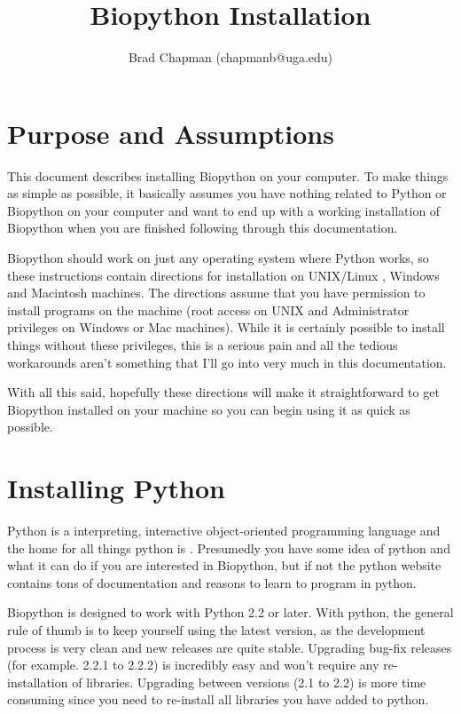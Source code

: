 \documentclass{article}
\begin{document}
\title{Biopython Installation}
\author{Brad Chapman (chapmanb@uga.edu)}

\maketitle
\tableofcontents

\section{Purpose and Assumptions}

This document describes installing Biopython on your computer. To make
things as simple as possible, it basically assumes you have nothing
related to Python or Biopython on your computer and want to end up with
a working installation of Biopython when you are finished following
through this documentation. 


Biopython should work on just any operating system where Python works,
so these instructions contain directions for installation on UNIX/Linux
, Windows and Macintosh machines. The directions assume 
that you have permission to install programs on the machine
(root access on UNIX and Administrator privileges on Windows or Mac
machines). While it is certainly possible to install things without
these privileges, this is a serious pain and all the tedious workarounds
aren't something that I'll go into very much in this documentation.

With all this said, hopefully these directions will make it
straightforward to get Biopython installed on your machine so you can
begin using it as quick as possible.

\section{Installing Python}

Python is a interpreting, interactive object-oriented programming
language and the home for all things python is
. Presumedly you have some idea of
python and what it can do if you are interested in Biopython, but if not
the python website contains tons of documentation and reasons to learn
to program in python.


Biopython is designed to work with Python 2.2 or later. With python, the
general rule of thumb is to keep yourself using the latest version, as
the development process is very clean and new releases are quite stable.
Upgrading bug-fix releases (for example. 2.2.1 to 2.2.2) 
is incredibly easy and won't require any re-installation of libraries.
Upgrading between versions (2.1 to 2.2) is more time consuming since you
need to re-install all libraries you have added to python.
\end{document}
